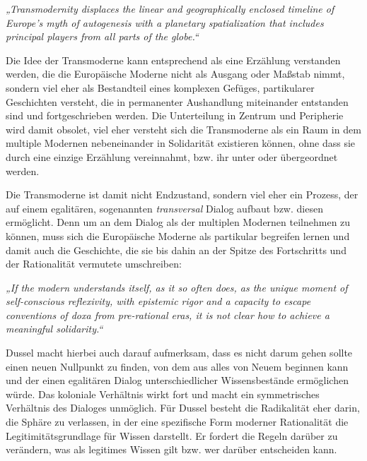 \begin{myenv}
    \textit{„Transmodernity displaces the linear and geographically enclosed timeline of
    Europe’s myth of autogenesis with a planetary spatialization that includes
    principal players from all parts of the globe.“\footnotemark}
\end{myenv}

Die Idee der Transmoderne kann entsprechend als eine Erzählung verstanden
werden, die die Europäische Moderne nicht als Ausgang oder Maßstab nimmt,
sondern viel eher als Bestandteil eines komplexen Gefüges, partikularer
Geschichten versteht, die in permanenter Aushandlung miteinander entstanden sind
und fortgeschrieben werden. Die Unterteilung in Zentrum und Peripherie wird
damit obsolet, viel eher versteht sich die Transmoderne als ein Raum in dem
multiple Modernen nebeneinander in Solidarität existieren können, ohne dass sie
durch eine einzige Erzählung vereinnahmt, bzw. ihr unter oder übergeordnet
werden.\footnotemark {}

Die Transmoderne ist damit nicht Endzustand, sondern viel eher ein Prozess, der
auf einem egalitären, sogenannten \textit{transversal} Dialog aufbaut bzw. diesen
ermöglicht. Denn um an dem Dialog als der multiplen Modernen teilnehmen zu
können, muss sich die Europäische Moderne als partikular begreifen lernen und
damit auch die Geschichte, die sie bis dahin an der Spitze des Fortschritts und
der Rationalität vermutete umschreiben:

\begin{myenv} 
    \textit{„If the modern understands itself, as it so often does, as the
    unique moment of self-conscious reflexivity, with epistemic rigor and a
    capacity to escape conventions of doxa from pre-rational eras, it is not
clear how to achieve a meaningful solidarity.“\footnotemark {}} \end{myenv}

Dussel macht hierbei auch darauf aufmerksam, dass es nicht darum gehen sollte
einen neuen Nullpunkt zu finden, von dem aus alles von Neuem beginnen kann und
der einen egalitären Dialog unterschiedlicher Wissensbestände ermöglichen würde.
Das koloniale Verhältnis wirkt fort und macht ein symmetrisches Verhältnis des
Dialoges unmöglich. Für Dussel besteht die Radikalität eher darin, die Sphäre zu
verlassen, in der eine spezifische Form moderner Rationalität die
Legitimitätsgrundlage für Wissen darstellt. Er fordert die Regeln darüber zu
verändern, was als legitimes Wissen gilt bzw. wer darüber entscheiden kann.

